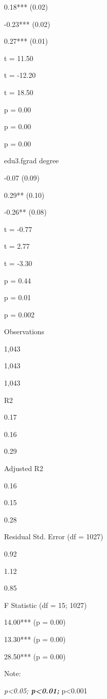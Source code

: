 \documentclass[
]{book}
\begin{document}
0.18*** (0.02)

-0.23*** (0.02)

0.27*** (0.01)

t = 11.50

t = -12.20

t = 18.50

p = 0.00

p = 0.00

p = 0.00

edu3.fgrad degree

-0.07 (0.09)

0.29** (0.10)

-0.26** (0.08)

t = -0.77

t = 2.77

t = -3.30

p = 0.44

p = 0.01

p = 0.002

Observations

1,043

1,043

1,043

R2

0.17

0.16

0.29

Adjusted R2

0.16

0.15

0.28

Residual Std. Error (df = 1027)

0.92

1.12

0.85

F Statistic (df = 15; 1027)

14.00*** (p = 0.00)

13.30*** (p = 0.00)

28.50*** (p = 0.00)

Note:

\emph{p\textless0.05; \textbf{p\textless0.01; }}p\textless0.001
\end{document}
